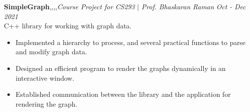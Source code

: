 \textbf{SimpleGraph}\sep \cpp\sep\elec\sep\js\sep{\it Course Project for CS293 $|$ Prof. Bhaskaran Raman} \hfill {\sl \small Oct - Dec 2021}\\
\vspace{-5pt}
\emerrow C++ library for working with graph data.
\begin{itemize}[itemsep = -1.3 mm, leftmargin=*]
\item Implemented a hierarchy to process, and several practical functions to parse and modify graph data.
\item Designed an efficient program to render the graphs dynamically in an interactive window.
\item Established communication between the library and the application for rendering the graph.
\end{itemize}